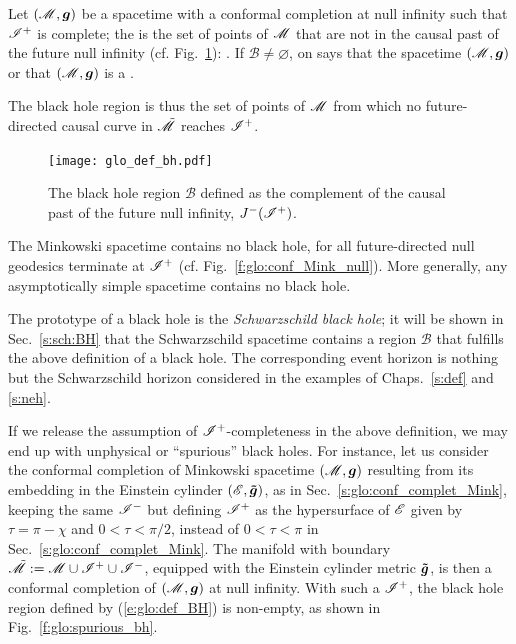 \begin{greybox}
Let $(\mathscr{M},\bm{g})$ be a spacetime with a conformal completion at null infinity
such that $\mathscr{I}^+$ is complete;
the 
is the set of points of $\mathscr{M}$ that are not in the causal past of the future null
infinity (cf. Fig.~\ref{f:glo:def_bh}):
\be \label{e:glo:def_BH}
     .
\ee
If $\mathscr{B} \neq \varnothing$, on says
that the spacetime $(\mathscr{M},\bm{g})$  or that
$(\mathscr{M},\bm{g})$ is a .
\end{greybox}
The black hole region is thus the set of points of $\mathscr{M}$
from which no future-directed causal curve in $\tilde{\mathscr{M}}$ reaches $\mathscr{I}^+$.


\begin{figure}
\centerline{\texttt{[image: glo\_def\_bh.pdf]}}
\caption[]{\label{f:glo:def_bh} \footnotesize
The black hole region $\mathscr{B}$ defined as the complement of
the causal past of the future null infinity, $J^-(\mathscr{I}^+)$.}
\end{figure}


\begin{example}
The Minkowski spacetime contains no black hole, for all future-directed null geodesics
terminate at $\mathscr{I}^+$ (cf. Fig.~\ref{f:glo:conf_Mink_null}).
More generally, any asymptotically simple spacetime contains no black hole.
\end{example}

\begin{example}
The prototype of a black hole is the \emph{Schwarzschild black hole}; it will
be shown in Sec.~\ref{s:sch:BH} that the Schwarzschild spacetime contains
a region $\mathscr{B}$ that fulfills the above definition of a black hole.
The corresponding event horizon is nothing but the
Schwarzschild horizon considered in the examples
of Chaps.~\ref{s:def} and \ref{s:neh}.
\end{example}

\begin{remark} \label{s:glo:spurious_bh}
If we release the assumption of $\mathscr{I}^+$-completeness in the above definition,
we may end up with unphysical or ``spurious'' black holes.
For instance, let us consider the conformal completion of Minkowski spacetime
$(\mathscr{M},\bm{g})$ resulting from its embedding in the Einstein cylinder
$(\mathscr{E},\bm{\tilde{g}})$, as in
Sec.~\ref{s:glo:conf_complet_Mink},
keeping the same $\mathscr{I}^-$ but
defining $\mathscr{I}^+$ as the
hypersurface of $\mathscr{E}$ given by $\tau = \pi - \chi$
and $0<\tau<\pi/2$, instead of  $0<\tau<\pi$ in Sec.~\ref{s:glo:conf_complet_Mink}.
The manifold with boundary $\tilde{\mathscr{M}} := \mathscr{M} \cup \mathscr{I}^+ \cup \mathscr{I}^-$,
equipped with the Einstein cylinder metric $\bm{\tilde g}$, is then a conformal completion
of $(\mathscr{M},\bm{g})$ at null infinity. With such a $\mathscr{I}^+$, the black hole region
defined by (\ref{e:glo:def_BH}) is non-empty, as shown in Fig.~\ref{f:glo:spurious_bh}.
\end{remark}

